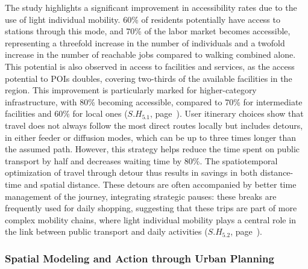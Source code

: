 \begin{refsegment}
The study highlights a significant improvement in accessibility rates due to the use of light individual mobility. 60\% of residents potentially have access to stations through this mode, and 70\% of the labor market becomes accessible, representing a threefold increase in the number of individuals and a twofold increase in the number of reachable jobs compared to walking combined alone. This potential is also observed in access to facilities and services, as the access potential to \acrfull{POIs} doubles, covering two-thirds of the available facilities in the region. This improvement is particularly marked for higher-category infrastructure, with 80\% becoming accessible, compared to 70\% for intermediate facilities and 60\% for local ones (\hyperref[sous-hypothese-5.1]{\(S.H_{5.1}\)}, page~\pageref{sous-hypothese-5.1}). User \gls{itinerary} choices show that travel does not always follow the most direct routes locally but includes detours, in either feeder or diffusion modes, which can be up to three times longer than the assumed path. However, this strategy helps reduce the time spent on public transport by half and decreases waiting time by 80\%. The spatiotemporal optimization of travel through \gls{detour} thus results in savings in both distance-time and spatial distance. These detours are often accompanied by better time management of the journey, integrating strategic pauses: these breaks are frequently used for daily shopping, suggesting that these trips are part of more complex mobility chains, where light individual mobility plays a central role in the link between public transport and daily activities (\hyperref[sous-hypothese-5.2]{\(S.H_{5.2}\)}, page~\pageref{sous-hypothese-5.2}).%

\subsubsection*{Spatial Modeling and Action through Urban Planning
    \label{conclusion-generale:principaux-apports-chapitre6}
    }


\end{refsegment}
